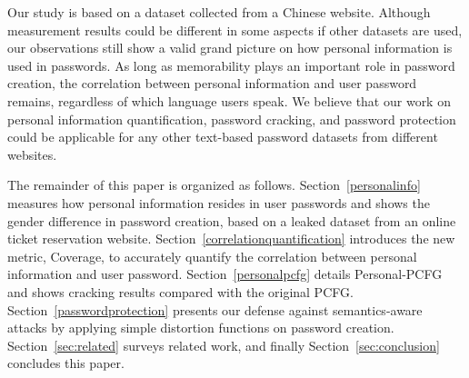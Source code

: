 Our study is based on a dataset collected from a Chinese
website. Although measurement results could be different in some
aspects if other datasets are used, our observations still show a
valid grand picture on how personal information is used in passwords.
As long as memorability plays an important role in password creation,
the correlation between personal information and user password
remains, regardless of which language users speak. We believe that our
work on personal information quantification, password cracking, and
password protection could be applicable for any other text-based
password datasets from different websites.

The remainder of this paper is organized as
follows. Section~\ref{personalinfo} measures how personal information
resides in user passwords and shows the gender difference in password
creation, based on a leaked dataset from an online ticket reservation
website. Section~\ref{correlationquantification} introduces the new
metric, Coverage, to accurately quantify the correlation between
personal information and user password.  Section~\ref{personalpcfg}
details Personal-PCFG and shows cracking results compared with the
original PCFG.  Section~\ref{passwordprotection} presents our
defense against semantics-aware attacks by applying simple distortion
functions on password creation. Section~\ref{sec:related} surveys
related work, and finally Section~\ref{sec:conclusion} concludes this
paper.
